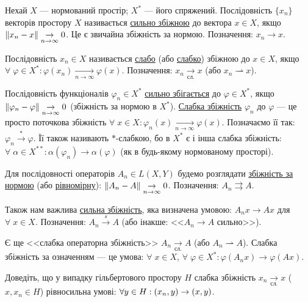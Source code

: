 
\begin{theory}
    Нехай $X$ --- нормований простір; $X^*$ --- його спряжений. Послідовність $\{x_n\}$ 
    векторів простору $X$ називається \ul{сильно збіжною} до вектора $x \in X$, якщо 
    $\left\lVert x_n - x\right\rVert \underset{n \rightarrow \infty}{\rightarrow} 0$. Це є звичайна збіжність 
    за нормою. Позначення: $x_n \rightarrow x$.

    Послідовність $x_n \in X$ називається \ul{слабо} (або \ul{слабко}) збіжною до $x \in X$, 
    якщо $\forall \; \varphi \in X^* : \varphi(x_n) \underset{n \rightarrow \infty}{\rightarrow} 
    \varphi(x)$. Позначення: $x_n \underset{\text{сл.}}{\rightarrow} x$ 
    (або $x_n \rightharpoonup x$).

    Послідовність функціоналів $\varphi_n \in X^*$ \ul{сильно збігається} до $\varphi \in X^*$, 
    якщо $\left\lVert\varphi_n - \varphi\right\rVert \underset{n \rightarrow \infty}{\rightarrow} 0$ 
    (збіжність за нормою в $X^*$). \ul{Слабка збіжність} $\varphi_n$ до $\varphi$ --- 
    це просто поточкова збіжність  $\forall \; x \in X : \varphi_n(x) \underset{n \rightarrow \infty}{\rightarrow} \varphi(x)$.
    Позначаємо її так: $\varphi_n \overset{*}{\rightarrow} \varphi$. 
    Її також називають $*$-слабкою, бо в $X^*$ є і інша слабка збіжність: $\forall \; \alpha 
    \in X^{**} : \alpha(\varphi_n) \rightarrow \alpha(\varphi)$ (як в будь-якому 
    нормованому просторі).

    Для послідовності операторів $A_n \in L(X, Y)$ будемо розглядати \ul{збіжність за нормою} 
    (або \ul{рівномірну}): $\left\lVert A_n - A\right\rVert \underset{n \rightarrow \infty}{\rightarrow} 0$. 
    Позначення: $A_n \rightrightarrows A$.

    Також нам важлива \ul{сильна збіжність}, яка визначена умовою: 
    $A_n x \rightarrow Ax$ для $\forall \; x \in X$. Позначення: $A_n \overset{s}{\rightarrow} A$ 
    (або інакше: <<$A_n \rightarrow A$ сильно>>).

    Є ще <<слабка операторна збіжність>> $A_n \underset{\text{сл.}}{\rightarrow} A$ 
    (або $A_n \rightharpoonup A$). Слабка збіжність за означенням --- це умова: 
    $\forall \; x \in X$, $\forall \; \varphi \in X^*: \varphi(A_nx) \rightarrow \varphi(Ax)$.
\end{theory}

\begin{exercise}
    Доведіть, що у випадку гільбертового простору $H$ слабка збіжність $x_n 
    \underset{\text{сл.}}{\rightarrow} x$ ($x, x_n \in H$) рівносильна умові: 
    $\forall y \in H : \left(x_n, y\right) \rightarrow \left(x, y\right)$.
\end{exercise}

